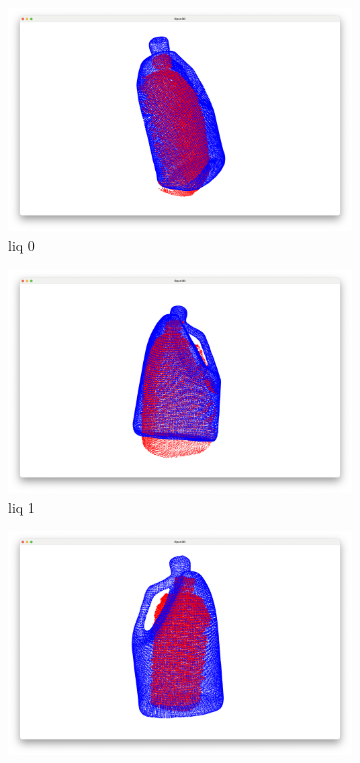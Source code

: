 \documentclass[conference]{IEEEtran}
\begin{document}
\begin{figure}
    \begin{subfigure}{0.24\textwidth}
        \includegraphics[width=\linewidth]{../code/icp_warm_up/liq_0.png}
        \caption{liq 0}
        \label{fig:liq_0}
    \end{subfigure}
    \hfill
    \begin{subfigure}{0.24\textwidth}
        \includegraphics[width=\linewidth]{../code/icp_warm_up/liq_1.png}
        \caption{liq 1}
        \label{fig:liq_1}
    \end{subfigure}
    \hfill
    \begin{subfigure}{0.24\textwidth}
        \includegraphics[width=\linewidth]{../code/icp_warm_up/liq_2.png}

\end{subfigure}
\end{figure}
\end{document}
